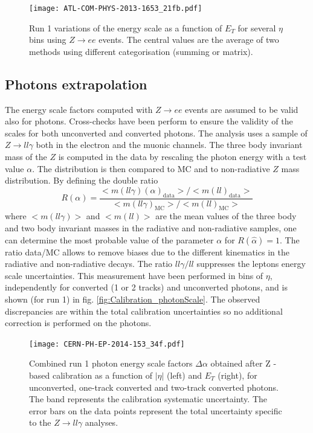 \begin{figure}[htbp]
\centering
\texttt{[image: ATL-COM-PHYS-2013-1653\_21fb.pdf]}
\caption{\label{fig:Calibration_ETDepZ}
  Run 1 variations of the energy scale as a function of $E_T$ for several $\eta$ bins using $Z\rightarrow ee$ events.
  The central values are the average of two methods using different categorisation (summing or matrix).
\cite{ATL-COM-PHYS-2013-1653}}
\end{figure}


\subsection{Photons extrapolation}

The energy scale factors computed with $Z\rightarrow ee$ events are assumed to be valid also for photons.
Cross-checks have been perform to ensure the validity of the scales for both unconverted and converted photons.
The analysis uses a sample of $Z\rightarrow ll\gamma$ both in the electron and the muonic channels.
The three body invariant mass of the $Z$ is computed in the data by rescaling the photon energy with a test value $\alpha$.
The distribution is then compared to MC and to non-radiative $Z$ mass distribution.
By defining the double ratio
\begin{equation}
  R(\alpha) = \frac{<m(ll\gamma)(\alpha)_\text{data}>/<m(ll)_\text{data}>}{<m(ll\gamma)_\text{MC}>/<m(ll)_\text{MC}>}
\end{equation}
where $<m(ll\gamma)>$ and $<m(ll)>$ are the mean values of the three body and two body invariant masses in the radiative and non-radiative samples, one can determine the most probable value of the parameter $\alpha$ for $R(\hat{\alpha})=1$.
The ratio data/MC allows to remove biases due to the different kinematics in the radiative and non-radiative decays.
The ratio $ll\gamma / ll$ suppresses the leptons energy scale uncertainties.
This measurement have been performed in bins of $\eta$, independently for converted (1 or 2 tracks) and unconverted photons, and is shown (for run 1) in fig. \ref{fig:Calibration_photonScale}.
The observed discrepancies are within the total calibration uncertainties so no additional correction  is performed on the photons.

\begin{figure}[htbp]
\centering
\texttt{[image: CERN-PH-EP-2014-153\_34f.pdf]}
\caption{\label{fig:Calibration_ETDepZ}
  Combined run 1 photon energy scale factors $\Delta\alpha$ obtained after Z -based calibration as a function of $|\eta|$  (left) and $E_T$ (right), for unconverted, one-track converted and two-track converted photons.
  The band represents the calibration systematic   uncertainty.
  The error bars on the data points represent the total uncertainty specific to the $Z\rightarrow ll\gamma$ analyses.
\cite{CERN-PH-EP-2014-153}}
\end{figure}


